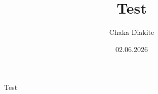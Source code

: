 \documentclass{article}
\title{Test}
\author{Chaka Diakite}
\date{02.06.2026}
\begin{document}
\maketitle
Test
\end{document}
